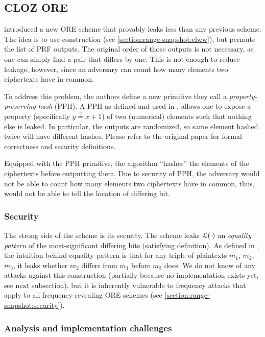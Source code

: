 \subsection{CLOZ ORE}

	\textcite{parameter-hiding-ore} introduced a new ORE scheme that provably leaks less than any previous scheme.
	The idea is to use \textcite{clww-ore} construction (see \cref{section:range-snapshot:clww}), but permute the list of PRF outputs.
	The original order of those outputs is not necessary, as one can simply find a pair that differs by one.
	This is not enough to reduce leakage, however, since an adversary can count how many elements two ciphertexts have in common.

	To address this problem, the authors define a new primitive they call a \emph{property-preserving hash} (PPH).
	A PPH as defined and used in \cite{parameter-hiding-ore}, allows one to expose a property (specifically $y \overset{?}{=} x + 1$) of two (numerical) elements such that nothing else is leaked.
	In particular, the outputs are randomized, so same element hashed twice will have different hashes.
	Please refer to the original paper \cite{parameter-hiding-ore} for formal correctness and security definitions.

	Equipped with the PPH primitive, the algorithm ``hashes'' the elements of the ciphertexts before outputting them.
	Due to security of PPH, the adversary would not be able to count how many elements two ciphertexts have in common, thus, would not be able to tell the location of differing bit.

	\subsubsection{Security}
		The strong side of the scheme is its security.
		The scheme leaks $\mathcal{L}(\cdot)$ an \emph{equality pattern} of the most-significant differing bits (satisfying \textcite{clww-ore} definition).
		As defined in \cite{parameter-hiding-ore}, the intuition behind equality pattern is that for any triple of plaintexts $m_1$, $m_2$, $m_3$, it leaks whether $m_2$ differs from $m_1$ before $m_3$ does. %
		We do not know of any attacks against this construction (partially because no implementation exists yet, see next subsection), but it is inherently vulnerable to frequency attacks that apply to all frequency-revealing ORE schemes (see \cref{section:range-snapshot:security}).

	\subsubsection{Analysis and implementation challenges}

